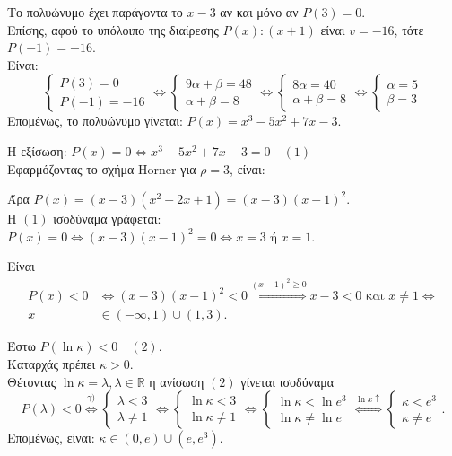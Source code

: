 \begin{alist}
\item Το πολυώνυμο έχει παράγοντα το $x - 3$ αν και μόνο αν $P(3) = 0$. \\
Επίσης, αφού το υπόλοιπο της διαίρεσης $P(x) : (x + 1)$ είναι $v = -16$, τότε $P(-1) = -16$. \\
Είναι: 
\[\begin{cases} P(3) = 0 \\ P(-1) = -16 \end{cases} \Leftrightarrow \begin{cases} 9\alpha + \beta = 48 \\ \alpha + \beta = 8 \end{cases} \Leftrightarrow \begin{cases} 8\alpha = 40 \\ \alpha + \beta = 8 \end{cases} \Leftrightarrow \begin{cases} \alpha = 5 \\ \beta = 3 \end{cases}\]
Επομένως, το πολυώνυμο γίνεται: $P(x) = x^3 - 5x^2 + 7x - 3$.
\item Η εξίσωση: $P(x) = 0 \Leftrightarrow x^3 - 5x^2 + 7x - 3 = 0 \quad (1)$ \\
Εφαρμόζοντας το σχήμα Horner για $\rho = 3$, είναι:
\begin{center}
\end{center}
Άρα $P(x) = (x - 3)(x^2 - 2x + 1) = (x - 3)(x - 1)^2$. \\
Η $(1)$ ισοδύναμα γράφεται: $P(x) = 0 \Leftrightarrow (x - 3)(x - 1)^2 = 0 \Leftrightarrow x = 3 \text{ ή } x = 1$.
\item Είναι
\begin{align*}
P(x) < 0 &\Leftrightarrow (x - 3)(x - 1)^2 < 0 \overset{(x - 1)^2 \ge 0}{\Longleftrightarrow} x - 3 < 0 \text{ και } x \ne 1 \Leftrightarrow \\
x &\in (-\infty, 1) \cup (1, 3).
\end{align*}
\item Έστω $P(\ln\kappa) < 0 \quad (2)$. \\
Καταρχάς πρέπει $\kappa > 0$. \\
Θέτοντας $\ln\kappa = \lambda, \lambda \in \mathbb{R}$ η ανίσωση $(2)$ γίνεται ισοδύναμα
\[P(\lambda) < 0 \overset{\gamma)}{\Longleftrightarrow} \begin{cases} \lambda < 3 \\ \lambda \ne 1 \end{cases} \Leftrightarrow \begin{cases} \ln\kappa < 3 \\ \ln\kappa \ne 1 \end{cases} \Leftrightarrow \begin{cases} \ln\kappa < \ln e^3 \\ \ln\kappa \ne \ln e \end{cases} \overset{\ln x \uparrow}{\Longleftrightarrow} \begin{cases} \kappa < e^3 \\ \kappa \ne e \end{cases}.\]
Επομένως, είναι: $\kappa \in (0, e) \cup (e, e^3)$.
\end{alist}

